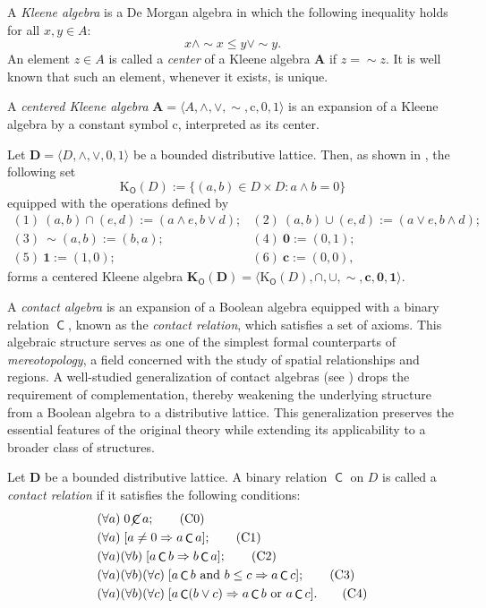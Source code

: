 \documentclass{article}
\DeclareMathOperator{\con}{\mathsf{C}}
\DeclareMathOperator{\notcon}{\cancel{ \con}}
\DeclareMathOperator{\Overl}{\mathsf{O}}
\newcommand{\KO}[1]{\mathrm{K}_{\Overl}(#1)}
\newcommand{\cn}{\mathrm{c}}
\newcommand{\cbf}{\mathbf{c}}
\newcommand{\one}{\mathbf{1}}
\newcommand{\zero}{\mathbf{0}}
\newcommand{\A}{\mathbf{A}}
\newcommand{\D}{\mathbf{D}}
\begin{document}
A \emph{Kleene algebra} is a De Morgan algebra in which the following inequality holds for all $x,y \in A$:
\[
x \wedge \sim x \leq y \vee \sim y.
\]
An element $z\in A$ is called a \emph{center} of a Kleene algebra $\A$ if $z=\sim z$. It is well known that such an element, whenever it exists, is unique.

A \emph{centered Kleene algebra} $\A=\langle A,\wedge,\vee,\sim,\cn,0,1\rangle$ is an expansion of a Kleene algebra by a constant symbol $\cn$, interpreted as its center.

Let $\D=\langle D,\wedge,\vee,0,1\rangle$ be a bounded distributive lattice. Then, as shown in \cite{kalman1958lattices}, the following set
\[
\KO{D} := \{(a,b) \in D \times D : a \wedge b = 0\}
\]
equipped with the operations defined by
\begin{equation}
\label{eq:twist-operations}
\begin{array}{ll}
(1) \ (a,b) \cap (e,d) := (a \wedge e, b \vee d); & (2) \ (a,b) \cup (e,d) := (a \vee e, b \wedge d); \\
(3) \ \sim(a,b) := (b,a); & (4) \ \zero := (0,1); \\
(5) \ \one := (1,0); & (6) \ \cbf := (0,0),
\end{array}
\end{equation}
forms a centered Kleene algebra $\mathbf{K}_{\Overl}(\D)=\langle \KO{D},\cap,\cup,\sim,\cbf,\zero,\one\rangle$. 

A \emph{contact algebra} is an expansion of a Boolean algebra equipped with a binary relation $\con$, known as the \emph{contact relation}, which satisfies a set of axioms. This algebraic structure serves as one of the simplest formal counterparts of \emph{mereotopology}, a field concerned with the study of spatial relationships and regions.
A well-studied generalization of contact algebras (see \cite{duntsch2006topological,duntsch2008distributive}) drops the requirement of complementation, thereby weakening the underlying structure from a Boolean algebra to a distributive lattice. This generalization preserves the essential features of the original theory while extending its applicability to a broader class of structures.

Let $\D$ be a bounded distributive lattice. A binary relation $\con$ on $D$ is called a \emph{contact relation} \cite{duntsch2006topological,duntsch2008distributive} if it satisfies the following conditions:
\begin{align}
 &(\forall a)\; 0\notcon a; \label{C0}\tag{C0} \\
 &(\forall a)\; [a \neq 0 \Rightarrow a\con a]; \label{C1}\tag{C1} \\
 &(\forall a)(\forall b)\; [a\con b \Rightarrow b\con a]; \label{C2}\tag{C2} \\
 &(\forall a)(\forall b)(\forall c)\; [a\con b \text{ and } b \leq c \Rightarrow a\con c]; \label{C3}\tag{C3} \\
 &(\forall a)(\forall b)(\forall c)\; [a\con (b \vee c) \Rightarrow a\con b \text{ or } a\con c]. \label{C4}\tag{C4}
\end{align}
\end{document}
